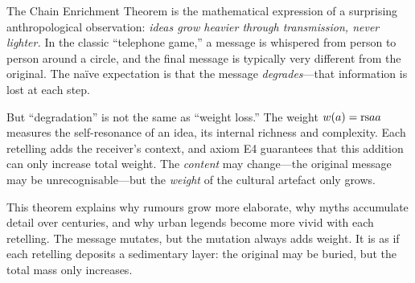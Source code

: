 \begin{interpretation}
\label{int:chain-enrichment}
The Chain Enrichment Theorem is the mathematical expression of a surprising
anthropological observation: \emph{ideas grow heavier through transmission,
never lighter.}  In the classic ``telephone game,'' a message is whispered
from person to person around a circle, and the final message is typically
very different from the original.  The na\"{i}ve expectation is that the message
\emph{degrades}---that information is lost at each step.

But ``degradation'' is not the same as ``weight loss.''  The weight
$w(a) = \mathrm{rs}{a}{a}$ measures the self-resonance of an idea, its internal
richness and complexity.  Each retelling adds the receiver's context, and
axiom E4 guarantees that this addition can only increase total weight.
The \emph{content} may change---the original message may be unrecognisable---but
the \emph{weight} of the cultural artefact only grows.

This theorem explains why rumours grow more elaborate, why myths accumulate
detail over centuries, and why urban legends become more vivid with each
retelling.  The message mutates, but the mutation always adds weight.  It is
as if each retelling deposits a sedimentary layer: the original may be
buried, but the total mass only increases.
\end{interpretation}

